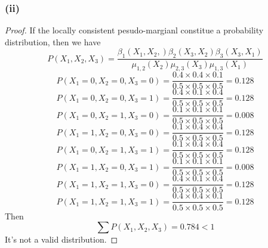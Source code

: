 \documentclass{article}
\begin{document}
\subsubsection*{(ii)}
\begin{proof}
    If the locally consistent pesudo-margianl constitue a probability distribution, then we have 
    $$P(X_1, X_2, X_3) = \frac{\beta_1(X_1, X_2,) \beta_2(X_3, X_2) \beta_3(X_3, X_1) }{\mu_{1,2} (X_2) \mu_{2,3} (X_3) \mu_{1,3} (X_1)}$$
    $$P(X_1=0, X_2=0, X_3=0) = \frac{0.4 \times 0.4 \times 0.1}{0.5 \times 0.5 \times 0.5} = 0.128$$
    $$P(X_1=0, X_2=0, X_3=1) = \frac{0.4 \times 0.1 \times 0.4}{0.5 \times 0.5 \times 0.5} = 0.128$$
    $$P(X_1=0, X_2=1, X_3=0) = \frac{0.1 \times 0.1 \times 0.1}{0.5 \times 0.5 \times 0.5} = 0.008$$  
    $$P(X_1=1, X_2=0, X_3=0) = \frac{0.1 \times 0.4 \times 0.4}{0.5 \times 0.5 \times 0.5} = 0.128$$
    $$P(X_1=0, X_2=1, X_3=1) = \frac{0.1 \times 0.4 \times 0.4}{0.5 \times 0.5 \times 0.5} = 0.128$$
    $$P(X_1=1, X_2=0, X_3=1) = \frac{0.1 \times 0.1 \times 0.1}{0.5 \times 0.5 \times 0.5} = 0.008$$
    $$P(X_1=1, X_2=1, X_3=0) = \frac{0.4 \times 0.1 \times 0.4}{0.5 \times 0.5 \times 0.5} = 0.128$$
    $$P(X_1=1, X_2=1, X_3=1) = \frac{0.4 \times 0.4 \times 0.1}{0.5 \times 0.5 \times 0.5} = 0.128$$
    Then $$\sum P(X_1, X_2, X_3) = 0.784 < 1$$ \noindent It's not a valid distribution.
\end{proof}
\end{document}
